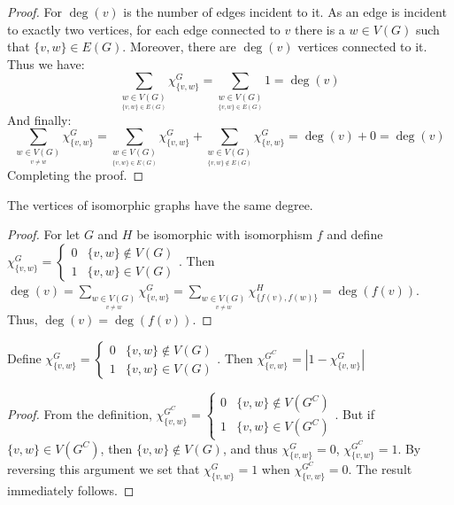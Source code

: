     \begin{proof}
        For $\deg(v)$ is the number of edges incident to it. As an edge is
        incident to exactly two vertices, for each edge connected to $v$
        there is a $w\in V(G)$ such that $\{v,w\} \in E(G)$. Moreover, there
        are $\deg(v)$ vertices connected to it. Thus we have:
        \begin{equation}
            \sum_{\underset{\{v,w\}\in E(G)}{w\in V(G)}} \chi_{\{v,w\}}^G
            =\sum_{\underset{\{v,w\}\in E(G)}{w\in V(G)}}1
            =\deg(v)
        \end{equation}
        And finally:
        \begin{equation}
            \sum_{\underset{v\ne w}{w\in V(G)}}\chi_{\{v,w\}}^G
            =\sum_{\underset{\{v,w\}\in E(G)}{w\in V(G)}}\chi_{\{v,w\}}^G
            +\sum_{\underset{\{v,w\}\notin E(G)}{w\in V(G)}}\chi_{\{v,w\}}^G
            =\deg(v)+0
            =\deg(v)
        \end{equation}
        Completing the proof.
    \end{proof}
    \begin{theorem}
    The vertices of isomorphic graphs have the same degree.
    \end{theorem}
    \begin{proof}
    For let $G$ and $H$ be isomorphic with isomorphism $f$ and define $\chi_{\{v,w\}}^G = \begin{cases} 0 & \{v,w\} \notin V(G) \\ 1 & \{v,w\} \in V(G) \end{cases}$. Then $\deg(v) = \sum_{\underset{v\ne w}{w\in V(G)}}\chi_{\{v,w\}}^G =\sum_{\underset{v\ne w}{w\in V(G)}}\chi_{\{f(v),f(w)\}}^H = \deg(f(v))$. Thus, $\deg(v) = \deg(f(v))$.
    \end{proof}
    \begin{theorem}
    Define  $\chi_{\{v,w\}}^G = \begin{cases} 0 & \{v,w\} \notin V(G) \\ 1 & \{v,w\} \in V(G) \end{cases}$. Then $\chi_{\{v,w\}}^{G^C} = |1-\chi_{\{v,w\}}^G|$
    \end{theorem}
    \begin{proof}
    From the definition, $\chi_{\{v,w\}}^{G^C} = \begin{cases} 0 & \{v,w\} \notin V(G^C) \\ 1 & \{v,w\} \in V(G^C) \end{cases}$. But if $\{v,w\} \in V({G^C})$, then $\{v,w\}\notin V(G)$, and thus $\chi_{\{v,w\}}^G = 0$, $\chi_{\{v,w\}}^{G^C} = 1$. By reversing this argument we set that $\chi_{\{v,w\}}^{G} = 1$ when $\chi_{\{v,w\}}^{G^C} = 0$. The result immediately follows.
    \end{proof}
